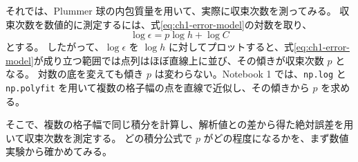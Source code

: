 それでは、Plummer 球の内包質量を用いて、実際に収束次数を測ってみる。
収束次数を数値的に測定するには、式\eqref{eq:ch1-error-model}の対数を取り、
\begin{equation}
 \log\epsilon
 =p\log h+\log C
\label{eq:ch1-log-error}
\end{equation}
とする。
したがって、$\log\epsilon$ を $\log h$ に対してプロットすると、式\eqref{eq:ch1-error-model}が成り立つ範囲では点列はほぼ直線上に並び、その傾きが収束次数 $p$ となる。
対数の底を変えても傾き $p$ は変わらない。Notebook 1 では、\texttt{np.log} と \texttt{np.polyfit} を用いて複数の格子幅の点を直線で近似し、その傾きから $p$ を求める。

そこで、複数の格子幅で同じ積分を計算し、解析値との差から得た絶対誤差を用いて収束次数を測定する。
どの積分公式で $p$ がどの程度になるかを、まず数値実験から確かめてみる。

